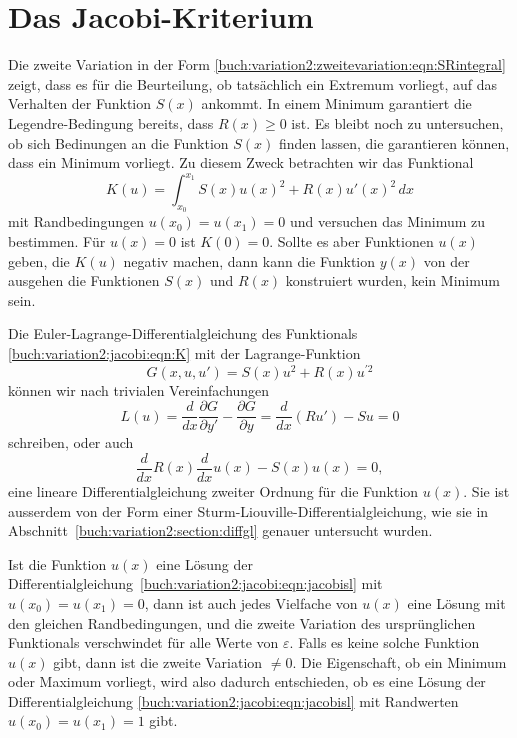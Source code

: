 %
%
%
\section{Das Jacobi-Kriterium
\label{buch:variation2:section:jacobi}}
Die zweite Variation in der Form
\eqref{buch:variation2:zweitevariation:eqn:SRintegral}
zeigt, dass es für die Beurteilung, ob tatsächlich ein Extremum 
vorliegt, auf das Verhalten der Funktion $S(x)$ ankommt.
In einem Minimum garantiert die Legendre-Bedingung bereits,
dass $R(x)\ge 0$ ist.
Es bleibt noch zu untersuchen, ob sich Bedinungen an die Funktion
$S(x)$ finden lassen, die garantieren können, dass ein Minimum
vorliegt.
Zu diesem Zweck betrachten wir das Funktional
\begin{equation}
K(u)
=
\int_{x_0}^{x_1}
S(x) u(x)^2 + R(x) u'(x)^2
\,dx
\label{buch:variation2:jacobi:eqn:K}
\end{equation}
mit Randbedingungen $u(x_0)=u(x_1)=0$ und versuchen das Minimum
zu bestimmen.
Für $u(x)=0$ ist $K(0)=0$.
Sollte es aber Funktionen $u(x)$ geben, die $K(u)$ negativ machen,
dann kann die Funktion $y(x)$ von der ausgehen die Funktionen $S(x)$
und $R(x)$ konstruiert wurden, kein Minimum sein.

Die Euler-Lagrange-Differentialgleichung des Funktionals
\eqref{buch:variation2:jacobi:eqn:K}
mit der Lagrange-Funk\-tion 
\[
G(x,u,u') = S(x) u^2 + R(x) u^{\prime 2}
\]
können wir nach trivialen Vereinfachungen
\[
L(u)
=
\frac{d}{dx}\frac{\partial G}{\partial y'}
-
\frac{\partial G}{\partial y}
=
\frac{d}{dx}(Ru') 
-
Su
=
0
\]
schreiben,
oder auch
\begin{equation}
\frac{d}{dx} R(x)\frac{d}{dx} u(x) - S(x) u(x) = 0,
\label{buch:variation2:jacobi:eqn:jacobisl}
\end{equation}
eine lineare Differentialgleichung zweiter Ordnung für die Funktion $u(x)$.
Sie ist ausserdem von der Form einer Sturm-Liouville-Differentialgleichung,
wie sie in Abschnitt~\ref{buch:variation2:section:diffgl} genauer
untersucht wurden.

Ist die Funktion $u(x)$ eine Lösung der
Differentialgleichung~\eqref{buch:variation2:jacobi:eqn:jacobisl}
mit $u(x_0)=u(x_1)=0$, dann ist auch jedes Vielfache von $u(x)$
eine Lösung mit den gleichen Randbedingungen, und die zweite Variation
des ursprünglichen Funktionals verschwindet für alle Werte von $\varepsilon$.
Falls es keine solche Funktion $u(x)$ gibt, dann ist die zweite
Variation $\ne 0$.
Die Eigenschaft, ob ein Minimum oder Maximum vorliegt, wird also
dadurch entschieden, ob es eine Lösung der Differentialgleichung
\eqref{buch:variation2:jacobi:eqn:jacobisl} mit
Randwerten $u(x_0)=u(x_1)=1$ gibt.

